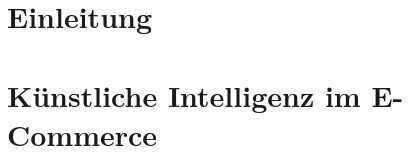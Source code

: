 \documentclass[twoside,twocolumn]{article}
\begin{document}
	
	\maketitle
	
	
	\section{Einleitung}
	

	\section{Künstliche Intelligenz im E-Commerce}
	

	
	
	
		
		
	
	
\end{document}
